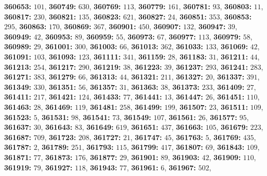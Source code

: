 \textsf{\bfseries 360653:} $101$, \textsf{\bfseries 360749:} $630$, \textsf{\bfseries 360769:} $113$, \textsf{\bfseries 360779:} $161$, \textsf{\bfseries 360781:} $93$, \textsf{\bfseries 360803:} $11$, \textsf{\bfseries 360817:} $230$, \textsf{\bfseries 360821:} $135$, \textsf{\bfseries 360823:} $621$, \textsf{\bfseries 360827:} $24$, \textsf{\bfseries 360851:} $353$, \textsf{\bfseries 360853:} $295$, \textsf{\bfseries 360863:} $170$, \textsf{\bfseries 360869:} $367$, \textsf{\bfseries 360901:} $450$, \textsf{\bfseries 360907:} $132$, \textsf{\bfseries 360947:} $39$, \textsf{\bfseries 360949:} $42$, \textsf{\bfseries 360953:} $89$, \textsf{\bfseries 360959:} $55$, \textsf{\bfseries 360973:} $67$, \textsf{\bfseries 360977:} $113$, \textsf{\bfseries 360979:} $58$, \textsf{\bfseries 360989:} $29$, \textsf{\bfseries 361001:} $300$, \textsf{\bfseries 361003:} $66$, \textsf{\bfseries 361013:} $362$, \textsf{\bfseries 361033:} $133$, \textsf{\bfseries 361069:} $42$, \textsf{\bfseries 361091:} $103$, \textsf{\bfseries 361093:} $123$, \textsf{\bfseries 361111:} $341$, \textsf{\bfseries 361159:} $28$, \textsf{\bfseries 361183:} $31$, \textsf{\bfseries 361211:} $44$, \textsf{\bfseries 361213:} $254$, \textsf{\bfseries 361217:} $290$, \textsf{\bfseries 361219:} $38$, \textsf{\bfseries 361223:} $39$, \textsf{\bfseries 361237:} $293$, \textsf{\bfseries 361241:} $283$, \textsf{\bfseries 361271:} $383$, \textsf{\bfseries 361279:} $66$, \textsf{\bfseries 361313:} $44$, \textsf{\bfseries 361321:} $211$, \textsf{\bfseries 361327:} $20$, \textsf{\bfseries 361337:} $391$, \textsf{\bfseries 361349:} $330$, \textsf{\bfseries 361351:} $56$, \textsf{\bfseries 361357:} $31$, \textsf{\bfseries 361363:} $38$, \textsf{\bfseries 361373:} $233$, \textsf{\bfseries 361409:} $27$, \textsf{\bfseries 361411:} $217$, \textsf{\bfseries 361421:} $124$, \textsf{\bfseries 361433:} $77$, \textsf{\bfseries 361441:} $13$, \textsf{\bfseries 361447:} $26$, \textsf{\bfseries 361451:} $110$, \textsf{\bfseries 361463:} $28$, \textsf{\bfseries 361469:} $119$, \textsf{\bfseries 361481:} $258$, \textsf{\bfseries 361499:} $199$, \textsf{\bfseries 361507:} $23$, \textsf{\bfseries 361511:} $109$, \textsf{\bfseries 361523:} $5$, \textsf{\bfseries 361531:} $98$, \textsf{\bfseries 361541:} $73$, \textsf{\bfseries 361549:} $107$, \textsf{\bfseries 361561:} $26$, \textsf{\bfseries 361577:} $95$, \textsf{\bfseries 361637:} $30$, \textsf{\bfseries 361643:} $83$, \textsf{\bfseries 361649:} $619$, \textsf{\bfseries 361651:} $437$, \textsf{\bfseries 361663:} $105$, \textsf{\bfseries 361679:} $223$, \textsf{\bfseries 361687:} $709$, \textsf{\bfseries 361723:} $208$, \textsf{\bfseries 361727:} $21$, \textsf{\bfseries 361747:} $45$, \textsf{\bfseries 361763:} $5$, \textsf{\bfseries 361769:} $435$, \textsf{\bfseries 361787:} $2$, \textsf{\bfseries 361789:} $251$, \textsf{\bfseries 361793:} $115$, \textsf{\bfseries 361799:} $417$, \textsf{\bfseries 361807:} $69$, \textsf{\bfseries 361843:} $109$, \textsf{\bfseries 361871:} $77$, \textsf{\bfseries 361873:} $176$, \textsf{\bfseries 361877:} $29$, \textsf{\bfseries 361901:} $89$, \textsf{\bfseries 361903:} $42$, \textsf{\bfseries 361909:} $110$, \textsf{\bfseries 361919:} $79$, \textsf{\bfseries 361927:} $118$, \textsf{\bfseries 361943:} $77$, \textsf{\bfseries 361961:} $6$, \textsf{\bfseries 361967:} $502$, 
